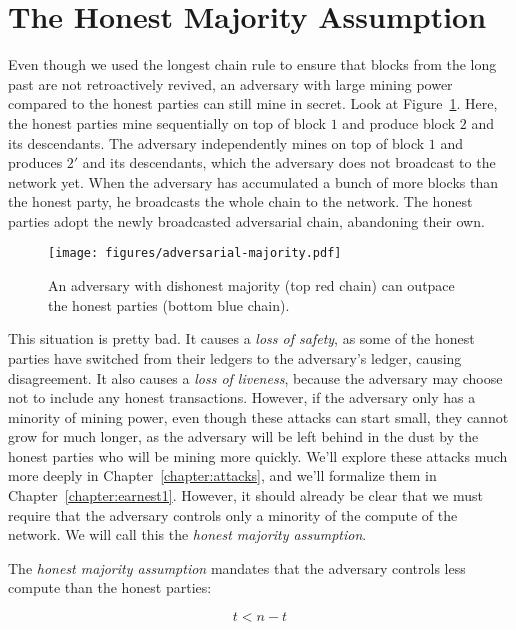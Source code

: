 \section{The Honest Majority Assumption}


Even though we used the longest chain rule to ensure that blocks from the long past are not
retroactively revived, an adversary with large mining power compared to the honest parties can
still mine in secret. Look at Figure~\ref{fig.adversarial-majority}. Here, the honest parties
mine sequentially on top of block $1$ and produce block $2$ and its descendants.
The adversary independently mines on top of block $1$ and produces $2'$ and its descendants,
which the adversary does not broadcast to the network yet. When the adversary has accumulated
a bunch of more blocks than the honest party, he broadcasts the whole chain to the network.
The honest parties adopt the newly broadcasted adversarial chain, abandoning their own.

\begin{figure}[h]
    \centering
    \texttt{[image: figures/adversarial-majority.pdf]}
    \caption{An adversary with dishonest majority (top red chain) can outpace the honest parties (bottom
             blue chain).}
    \label{fig.adversarial-majority}
\end{figure}

This situation is pretty bad. It causes a \emph{loss of safety}, as some of the honest parties have
switched from their ledgers to the adversary's ledger, causing disagreement. It also causes a
\emph{loss of liveness}, because the adversary may choose not to include any honest transactions.
However, if the adversary
only has a minority of mining power, even though these attacks can start small, they cannot grow
for much longer, as the adversary will be left behind in the dust by the honest parties who will
be mining more quickly.
We'll explore these attacks much more deeply in Chapter~\ref{chapter:attacks},
and we'll formalize them in Chapter~\ref{chapter:earnest1}. However, it should already be clear
that we must require that the adversary controls only a minority of the compute of the network.
We will call this the \emph{honest majority assumption}.

\begin{definition}
  The \emph{honest majority assumption} mandates that the adversary controls less compute than
  the honest parties:

  \[
    t < n - t
  \]
\end{definition}

